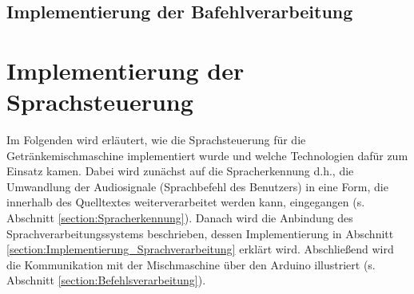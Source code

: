 \subsection{Implementierung der Bafehlverarbeitung}
\section{Implementierung der Sprachsteuerung}
Im Folgenden wird erläutert, wie die Sprachsteuerung für die Getränkemischmaschine implementiert wurde und welche Technologien dafür zum Einsatz kamen. Dabei wird zunächst auf die Spracherkennung d.h., die Umwandlung der Audiosignale (Sprachbefehl des Benutzers) in eine Form, die innerhalb des Quelltextes weiterverarbeitet werden kann, eingegangen (s. Abschnitt \ref{section:Spracherkennung}). Danach wird die Anbindung des Sprachverarbeitungssystems beschrieben, dessen Implementierung in Abschnitt \ref{section:Implementierung_Sprachverarbeitung} erklärt wird. Abschließend wird die Kommunikation mit der Mischmaschine über den Arduino illustriert (s. Abschnitt \ref{section:Befehlsverarbeitung}).
